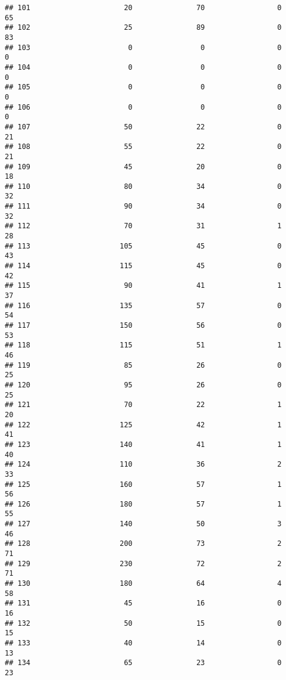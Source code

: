\documentclass[
]{article}
\begin{document}
\begin{verbatim}
## 101                      20               70                 0         65
## 102                      25               89                 0         83
## 103                       0                0                 0          0
## 104                       0                0                 0          0
## 105                       0                0                 0          0
## 106                       0                0                 0          0
## 107                      50               22                 0         21
## 108                      55               22                 0         21
## 109                      45               20                 0         18
## 110                      80               34                 0         32
## 111                      90               34                 0         32
## 112                      70               31                 1         28
## 113                     105               45                 0         43
## 114                     115               45                 0         42
## 115                      90               41                 1         37
## 116                     135               57                 0         54
## 117                     150               56                 0         53
## 118                     115               51                 1         46
## 119                      85               26                 0         25
## 120                      95               26                 0         25
## 121                      70               22                 1         20
## 122                     125               42                 1         41
## 123                     140               41                 1         40
## 124                     110               36                 2         33
## 125                     160               57                 1         56
## 126                     180               57                 1         55
## 127                     140               50                 3         46
## 128                     200               73                 2         71
## 129                     230               72                 2         71
## 130                     180               64                 4         58
## 131                      45               16                 0         16
## 132                      50               15                 0         15
## 133                      40               14                 0         13
## 134                      65               23                 0         23

\end{verbatim}
\end{document}
